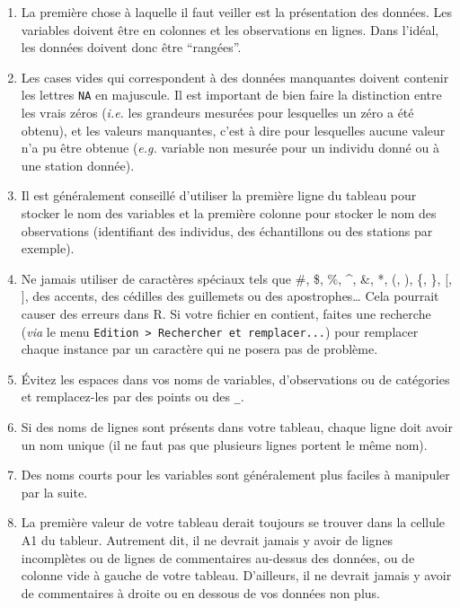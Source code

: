 \documentclass[a4paperpaper,]{article}
\providecommand{\tightlist}{%
  \setlength{\itemsep}{0pt}\setlength{\parskip}{0pt}}
\begin{document}
\begin{enumerate}
\def\labelenumi{\arabic{enumi}.}
\tightlist
\item
  La première chose à laquelle il faut veiller est la présentation des données. Les variables doivent être en colonnes et les observations en lignes. Dans l'idéal, les données doivent donc être ``rangées''.
\item
  Les cases vides qui correspondent à des données manquantes doivent contenir les lettres \texttt{NA} en majuscule. Il est important de bien faire la distinction entre les vrais zéros (\emph{i.e.} les grandeurs mesurées pour lesquelles un zéro a été obtenu), et les valeurs manquantes, c'est à dire pour lesquelles aucune valeur n'a pu être obtenue (\emph{e.g.} variable non mesurée pour un individu donné ou à une station donnée).
\item
  Il est généralement conseillé d'utiliser la première ligne du tableau pour stocker le nom des variables et la première colonne pour stocker le nom des observations (identifiant des individus, des échantillons ou des stations par exemple).
\item
  Ne jamais utiliser de caractères spéciaux tels que \#, \$, \%, \^{}, \&, *, (, ), \{, \}, {[}, {]}, des accents, des cédilles des guillemets ou des apostrophes\ldots{} Cela pourrait causer des erreurs dans R. Si votre fichier en contient, faites une recherche (\emph{via} le menu \texttt{Edition\ \textgreater{}\ Rechercher\ et\ remplacer...}) pour remplacer chaque instance par un caractère qui ne posera pas de problème.
\item
  Évitez les espaces dans vos noms de variables, d'observations ou de catégories et remplacez-les par des points ou des \texttt{\_}.
\item
  Si des noms de lignes sont présents dans votre tableau, chaque ligne doit avoir un nom unique (il ne faut pas que plusieurs lignes portent le même nom).
\item
  Des noms courts pour les variables sont généralement plus faciles à manipuler par la suite.
\item
  La première valeur de votre tableau derait toujours se trouver dans la cellule A1 du tableur. Autrement dit, il ne devrait jamais y avoir de lignes incomplètes ou de lignes de commentaires au-dessus des données, ou de colonne vide à gauche de votre tableau. D'ailleurs, il ne devrait jamais y avoir de commentaires à droite ou en dessous de vos données non plus.
\end{enumerate}
\end{document}
